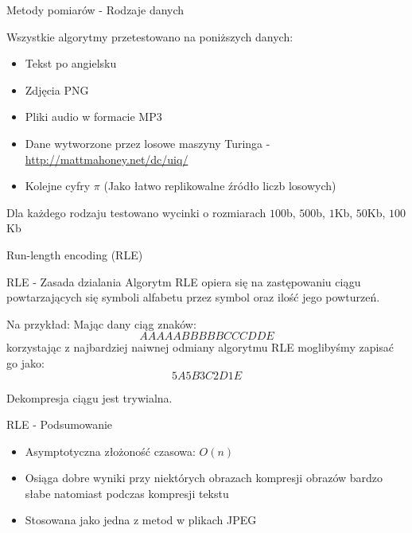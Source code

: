 \documentclass[aspectratio=169]{beamer}
\begin{document}
    \begin{frame}{Metody pomiarów - Rodzaje danych}

        Wszystkie algorytmy przetestowano na poniższych danych:

        \begin{itemize}
            \item Tekst po angielsku %
            \item Zdjęcia PNG 
            \item Pliki audio w formacie MP3
            \item Dane wytworzone przez losowe maszyny Turinga - \url{http://mattmahoney.net/dc/uiq/}
            \item Kolejne cyfry $\pi$ (Jako łatwo replikowalne źródło liczb losowych)
        \end{itemize}


        Dla każdego rodzaju testowano wycinki o rozmiarach $100$b, $500$b, $1$Kb, $50$Kb, $100$Kb
    \end{frame}
    


    \begin{frame}[plain,c]
        \begin{center}
            \Large Run-length encoding (RLE)
        \end{center}
    \end{frame}

    \begin{frame}{RLE - Zasada dzialania}
        Algorytm RLE opiera się na zastępowaniu ciągu powtarzających się symboli alfabetu
        przez symbol oraz ilość jego powturzeń.
        
        Na przykład:
        Mając dany ciąg znaków: 
        $$AAAAABBBBBCCCDDE$$ 
        korzystając z najbardziej naiwnej odmiany algorytmu RLE moglibyśmy zapisać go jako:
        $$5A5B3C2D1E$$

        Dekompresja ciągu jest trywialna.
    \end{frame}

    \begin{frame}{RLE - Podsumowanie}
        \begin{itemize}
            \item Asymptotyczna złożoność czasowa: $O(n)$
            \item Osiąga dobre wyniki przy niektórych obrazach kompresji obrazów bardzo słabe 
            natomiast podczas kompresji tekstu
            \item Stosowana jako jedna z metod w plikach JPEG
        \end{itemize}
    \end{frame}
    
\end{document}
